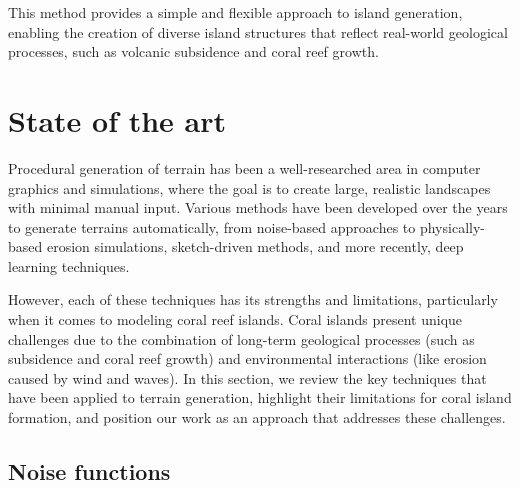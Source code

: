 This method provides a simple and flexible approach to island generation, enabling the creation of diverse island structures that reflect real-world geological processes, such as volcanic subsidence and coral reef growth.



\section{State of the art}
Procedural generation of terrain has been a well-researched area in computer graphics and simulations, where the goal is to create large, realistic landscapes with minimal manual input. Various methods have been developed over the years to generate terrains automatically, from noise-based approaches to physically-based erosion simulations, sketch-driven methods, and more recently, deep learning techniques.

However, each of these techniques has its strengths and limitations, particularly when it comes to modeling coral reef islands. Coral islands present unique challenges due to the combination of long-term geological processes (such as subsidence and coral reef growth) and environmental interactions (like erosion caused by wind and waves). In this section, we review the key techniques that have been applied to terrain generation, highlight their limitations for coral island formation, and position our work as an approach that addresses these challenges.

\subsection{Noise functions}

